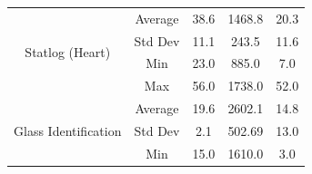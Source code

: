 \documentclass[journal]{IEEEtran}
\begin{document}
\begin{table}[]
\begin{tabular}{|c|c|c|c|c|}
		\multirow{4}{*}{Statlog (Heart)}       & Average                                  & 38.6                                                                                          & 1468.8                                                                                                          & 20.3                                                                                                \\ \cline{2-5} 
		& Std Dev                                  & 11.1                                                                                          & 243.5                                                                                                           & 11.6                                                                                                \\ \cline{2-5} 
		& Min                                      & 23.0                                                                                          & 885.0                                                                                                           & 7.0                                                                                                 \\ \cline{2-5} 
		& Max                                      & 56.0                                                                                          & 1738.0                                                                                                          & 52.0                                                                                                \\ \hline
		\multirow{4}{*}{Glass Identification}  & Average                                  & 19.6                                                                                          & 2602.1                                                                                                          & 14.8                                                                                                \\ \cline{2-5} 
		& Std Dev                                  & 2.1                                                                                           & 502.69                                                                                                          & 13.0                                                                                                \\ \cline{2-5} 
		& Min                                      & 15.0                                                                                          & 1610.0                                                                                                          & 3.0                                                                                                 \\ \cline{2-5} 

\end{tabular}
\end{table}
\end{document}

